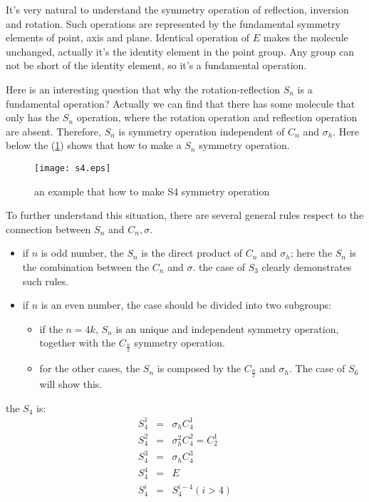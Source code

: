 It's very natural to understand the symmetry operation of reflection,
inversion and rotation. Such operations are represented by the
fundamental symmetry elements of point, axis and plane.  Identical
operation of $E$ makes the molecule unchanged, actually it's the
identity element in the point group. Any group can not be short of the
identity element, so it's a fundamental operation.

Here is an interesting question that why the rotation-reflection
$S_{n}$ is a fundamental operation? Actually we can find that there
has some molecule that only has the $S_{n}$ operation, where the
rotation operation and reflection operation are absent. Therefore,
$S_{n}$ is symmetry operation independent of $C_{n}$ and
$\sigma_{h}$. Here below the (\ref{GROUP11}) shows that how to make a
$S_{n}$ symmetry operation.

\begin{figure}[htp]
  \begin{center}
    \texttt{[image: s4.eps]}
    \caption{an example that how to make S4 symmetry operation}
    \label{GROUP11}
  \end{center}
\end{figure}

To further understand this situation, there are several general rules
respect to the connection between $S_{n}$ and $C_{n}, \sigma$.
\begin{itemize}
\item if $n$ is odd number, the $S_{n}$ is the direct product of
  $C_{n}$ and $\sigma_{h}$; here the $S_{n}$ is the combination
  between the $C_{n}$ and $\sigma$. the case of $S_{3}$ clearly
  demonstrates such rules.
\item if $n$ is an even number, the case should be divided into two
  subgroups:
  \begin{itemize}
  \item if the $n=4k$, $S_{n}$ is an unique and independent symmetry
    operation, together with the $C_{\frac{n}{2}}$ symmetry operation.
  \item for the other cases, the $S_{n}$ is composed by the
    $C_{\frac{n}{2}}$ and $\sigma_{h}$. The case of $S_{6}$ will show
    this.
  \end{itemize}
\end{itemize}

the $S_{4}$ is:
\begin{eqnarray}\label{GROUPeq:2}
  S^{1}_{4} &=& \sigma_{h}C^{1}_{4}  \nonumber \\
  S^{2}_{4} &=& \sigma^{2}_{h}C^{2}_{4} = C^{1}_{2} \nonumber \\
  S^{3}_{4} &=& \sigma_{h}C^{3}_{4}   \nonumber \\
  S^{4}_{4} &=& E  \nonumber \\
  S^{i}_{4} &=& S^{i-4}_{4} (i > 4)
\end{eqnarray}

